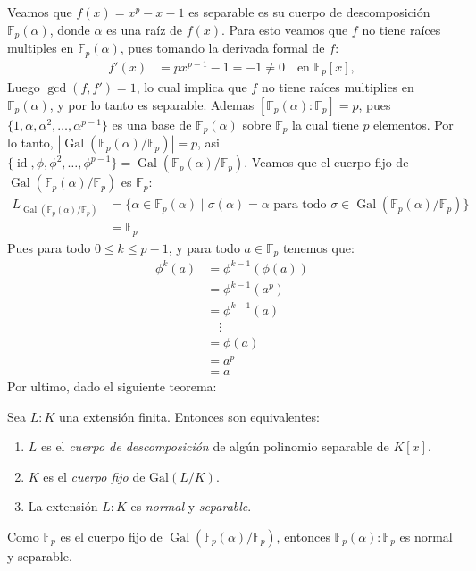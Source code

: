 \begin{solucion}
    Veamos que $f(x)=x^{p}-x-1$ es separable es su cuerpo de descomposición $\mathbb F_p(\alpha)$, donde $\alpha$ es una raíz de $f(x)$. Para esto veamos que $f$ no tiene raíces multiples en $\mathbb F_p(\alpha)$, pues tomando la derivada formal de $f$:
    \begin{align*}
        f'(x) &= p x^{p-1} - 1 = -1 \neq 0 \quad \text{en } \mathbb F_p[x],
    \end{align*}
    Luego $\operatorname{gcd}(f,f')=1$, lo cual implica que $f$ no tiene raíces multiplies en $\mathbb F_p(\alpha)$, y por lo tanto es separable.
    Ademas $[\mathbb F_p(\alpha):\mathbb F_p]=p$, pues $\{1, \alpha, \alpha^2, \ldots, \alpha^{p-1}\}$ es una base de $\mathbb F_p(\alpha)$ sobre $\mathbb F_p$ la cual tiene $p$ elementos. Por lo tanto, $|\operatorname{Gal}(\mathbb F_p(\alpha)/\mathbb F_p)|=p$, asi $\{\operatorname{id}, \phi, \phi^2, \ldots, \phi^{p-1}\} = \operatorname{Gal}(\mathbb F_p(\alpha)/\mathbb F_p)$. Veamos que el cuerpo fijo de $\operatorname{Gal}(\mathbb F_p(\alpha)/\mathbb F_p)$ es $\mathbb F_p$:
    \begin{align*}
       L_{\operatorname{Gal}(\mathbb F_p(\alpha)/\mathbb F_p)} &= \{\alpha \in \mathbb F_p(\alpha) \mid \sigma(\alpha) = \alpha \text{ para todo } \sigma \in \operatorname{Gal}(\mathbb F_p(\alpha)/\mathbb F_p)\}\\
         &= \mathbb F_p
    \end{align*}
    Pues para todo $0\leq k \leq p-1$, y para todo $a \in \mathbb F_p$ tenemos que:
    \begin{align*}
        \phi^k(a) &= \phi^{k-1}(\phi(a))\\
        &= \phi^{k-1}(a^p)\\
        &= \phi^{k-1}(a)\\
        &\quad \vdots\\
        &= \phi(a)\\
        &= a^p\\
        &= a
    \end{align*}
    Por ultimo, dado el siguiente teorema:
    \begin{tcolorbox}[colback=white,colframe=black,title=Teorema]
Sea \(L:K\) una extensión finita. Entonces son equivalentes:
\begin{enumerate}
  \item \(L\) es el \emph{cuerpo de descomposición} de algún polinomio separable de \(K[x]\).
  \item \(K\) es el \emph{cuerpo fijo} de \(\mathrm{Gal}(L/K)\).
  \item La extensión \(L:K\) es \emph{normal} y \emph{separable}.
\end{enumerate}
\end{tcolorbox}
Como $\mathbb F_p$ es el cuerpo fijo de $\operatorname{Gal}(\mathbb F_p(\alpha)/\mathbb F_p)$, entonces $\mathbb F_p(\alpha):\mathbb F_p$ es normal y separable.
\end{solucion}